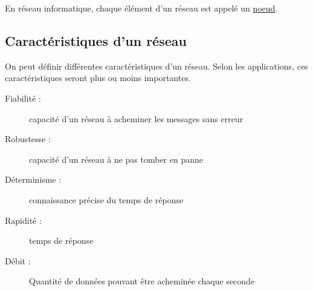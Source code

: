 En réseau informatique, chaque élément d'un réseau est appelé un  \hyperlink{DefNoeud}{noeud}.



\subsection{Caractéristiques d'un réseau}
On peut définir différentes caractéristiques d'un réseau. Selon les applications, ces caractéristiques seront plus ou moins importantes.
\begin{description}
  \item [Fiabilité : ] capacité d'un réseau à acheminer les messages sans erreur
  \item [Robustesse : ] capacité d'un réseau à ne pas tomber en panne
  \item [Déterminisme : ] connaissance précise du temps de réponse
  \item [Rapidité : ] temps de réponse
  \item [Débit : ] Quantité de données pouvant être acheminée chaque seconde
\end{description}

